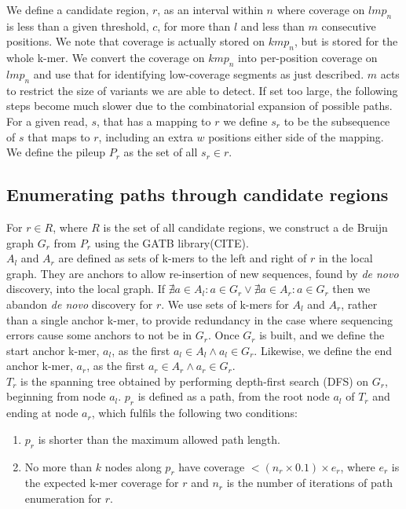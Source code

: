 We define a candidate region, $r$, as an interval within $n$ where coverage on $lmp_n$ is less than a given threshold, $c$, for more than $l$ and less than $m$ consecutive positions. We note that coverage is actually stored on $kmp_n$, but is stored for the whole k-mer. We convert the coverage on $kmp_n$ into per-position coverage on $lmp_n$ and use that for identifying low-coverage segments as just described. $m$ acts to restrict the size of variants we are able to detect. If set too large, the following steps become much slower due to the combinatorial expansion of possible paths. \\
For a given read, $s$, that has a mapping to $r$ we define $s_r$ to be the subsequence of $s$ that maps to $r$, including an extra $w$ positions either side of the mapping. We define the pileup $P_r$ as the set of all $s_r \in r$.

\subsection{Enumerating paths through candidate regions}

For $r \in R$, where $R$ is the set of all candidate regions, we construct a de Bruijn graph $G_r$ from $P_r$ using the GATB library(CITE). \\
$A_l$ and $A_r$ are defined as sets of k-mers to the left and right of $r$ in the local graph. They are anchors to allow re-insertion of new sequences, found by \textit{de novo} discovery, into the local graph. If  $\nexists a \in A_l : a \in G_r \lor \nexists a \in A_r : a \in G_r$ then we abandon \textit{de novo} discovery for $r$. We use sets of k-mers for $A_l$ and $A_r$, rather than a single anchor k-mer, to provide redundancy in the case where sequencing errors cause some anchors to not be in $G_r$. Once $G_r$ is built, and we define the start anchor k-mer, $a_l$, as the first $a_l \in A_l \land a_l \in G_r$. Likewise, we define the end anchor k-mer, $a_r$, as the first $a_r \in A_r \land a_r \in G_r$.\\

$T_r$ is the spanning tree obtained by performing depth-first search (DFS) on $G_r$, beginning from node $a_l$. $p_r$ is defined as a path, from the root node $a_l$ of $T_r$ and ending at node $a_r$, which fulfils the following two conditions:

\begin{enumerate}
  \item $p_r$ is shorter than the maximum allowed path length.
  \item No more than $k$ nodes along $p_r$ have coverage $< (n_r \times 0.1) \times e_r$, where $e_r$ is the expected k-mer coverage for $r$ and $n_r$ is the number of iterations of path enumeration for $r$.
\end{enumerate}

